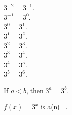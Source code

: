 \documentclass{ximera}
\author{Lee Wayand}
\begin{document}
\begin{example}


\begin{question}


$3^{-2}$ \, \wordChoice{\choice[correct]{$<$} \choice{$>$}} \, $3^{-1}$.  \\

$3^{-1}$ \, \wordChoice{\choice[correct]{$<$} \choice{$>$}} \, $3^{0}$.  \\

$3^{0}$ \, \wordChoice{\choice[correct]{$<$} \choice{$>$}} \, $3^{1}$.  \\

$3^{1}$ \, \wordChoice{\choice[correct]{$<$} \choice{$>$}} \, $3^{2}$.  \\

$3^{2}$ \, \wordChoice{\choice[correct]{$<$} \choice{$>$}} \, $3^{3}$.  \\

$3^{3}$ \, \wordChoice{\choice[correct]{$<$} \choice{$>$}} \, $3^{4}$.  \\

$3^{4}$ \, \wordChoice{\choice[correct]{$<$} \choice{$>$}} \, $3^{5}$.  \\

$3^{5}$ \, \wordChoice{\choice[correct]{$<$} \choice{$>$}} \, $3^{6}$.  \\


\end{question}




\begin{question}



If $a < b$, then $3^{a}$ \, \wordChoice{\choice[correct]{$<$} \choice{$>$}} \, $3^{b}$.  \\



\end{question}





\begin{question}



$f(x) = 3^{x}$  is a(n) \,  .  \\



\end{question}





















\end{example}
\end{document}
